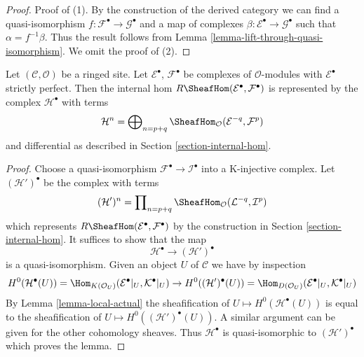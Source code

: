 \begin{proof}
Proof of (1).
By the construction of the derived category we can find a quasi-isomorphism
$f : \mathcal{F}^\bullet \to \mathcal{G}^\bullet$ and a map of complexes
$\beta : \mathcal{E}^\bullet \to \mathcal{G}^\bullet$ such that
$\alpha = f^{-1}\beta$. Thus the result follows from
Lemma \ref{lemma-lift-through-quasi-isomorphism}.
We omit the proof of (2).
\end{proof}

\begin{lemma}
\label{lemma-Rhom-strictly-perfect}
Let $(\mathcal{C}, \mathcal{O})$ be a ringed site.
Let $\mathcal{E}^\bullet$, $\mathcal{F}^\bullet$ be complexes
of $\mathcal{O}$-modules with $\mathcal{E}^\bullet$ strictly perfect.
Then the internal hom $R\SheafHom(\mathcal{E}^\bullet, \mathcal{F}^\bullet)$
is represented by the complex $\mathcal{H}^\bullet$ with terms
$$
\mathcal{H}^n =
\bigoplus\nolimits_{n = p + q}
\SheafHom_\mathcal{O}(\mathcal{E}^{-q}, \mathcal{F}^p)
$$
and differential as described in Section \ref{section-internal-hom}.
\end{lemma}

\begin{proof}
Choose a quasi-isomorphism $\mathcal{F}^\bullet \to \mathcal{I}^\bullet$
into a K-injective complex. Let $(\mathcal{H}')^\bullet$ be the
complex with terms
$$
(\mathcal{H}')^n =
\prod\nolimits_{n = p + q}
\SheafHom_\mathcal{O}(\mathcal{L}^{-q}, \mathcal{I}^p)
$$
which represents $R\SheafHom(\mathcal{E}^\bullet, \mathcal{F}^\bullet)$
by the construction in Section \ref{section-internal-hom}. It suffices
to show that the map
$$
\mathcal{H}^\bullet \longrightarrow (\mathcal{H}')^\bullet
$$
is a quasi-isomorphism. Given an object $U$ of $\mathcal{C}$ we have
by inspection
$$
H^0(\mathcal{H}^\bullet(U)) =
\Hom_{K(\mathcal{O}_U)}(\mathcal{E}^\bullet|_U, \mathcal{K}^\bullet|_U)
\to
H^0((\mathcal{H}')^\bullet(U)) =
\Hom_{D(\mathcal{O}_U)}(\mathcal{E}^\bullet|_U, \mathcal{K}^\bullet|_U)
$$
By Lemma \ref{lemma-local-actual} the sheafification of
$U \mapsto H^0(\mathcal{H}^\bullet(U))$
is equal to the sheafification of
$U \mapsto H^0((\mathcal{H}')^\bullet(U))$. A similar argument can be
given for the other cohomology sheaves. Thus $\mathcal{H}^\bullet$
is quasi-isomorphic to $(\mathcal{H}')^\bullet$ which proves the lemma.
\end{proof}


